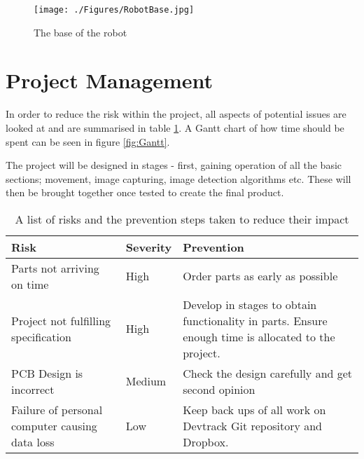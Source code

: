 \begin{figure}
\texttt{[image: ./Figures/RobotBase.jpg]}
\caption{The base of the robot}
\label{fig:RobotBase}
\end{figure}

\section{Project Management}
In order to reduce the risk within the project, all aspects of potential issues are looked at and are summarised in table \ref{tab:risk}. A Gantt chart of how time should be spent can be seen in figure \ref{fig:Gantt}. 

The project will be designed in stages - first, gaining operation of all the basic sections; movement, image capturing, image detection algorithms etc. These will then be brought together once tested to create the final product. 
\begin{table}
\begin{tabular}{|p{6cm}|p{2cm}|p{6cm}|}\hline
Risk						&	Severity	&	Prevention \\ \hline
Parts not arriving on time	&	High		&	Order parts as early as possible \\
Project not fulfilling specification				&	High		&	Develop in stages to obtain functionality in parts. Ensure enough time is allocated to the project.	\\
PCB Design is incorrect		&	Medium		&	Check the design carefully and get second opinion \\
Failure of personal computer causing data loss & Low	& 	Keep back ups of all work on Devtrack Git repository and Dropbox.\\

\hline
\end{tabular}
\caption{A list of risks and the prevention steps taken to reduce their impact}
\label{tab:risk}
\end{table}
